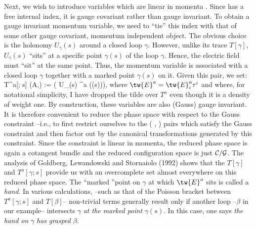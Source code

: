 Next, we wish to introduce variables which are linear in momenta \E .
Since \E\- has a free internal index, it is gauge covariant rather than
gauge invariant. To obtain a gauge invariant momentum variable, we need
to ``tie'' this index with that of some other gauge covariant, momentum
independent object. The obvious choice is the holonomy $U_\gamma(s)$
around a closed loop $\gamma$. However, unlike its trace $T[\gamma ]$,
$U_\gamma(s)$ ``sits'' at a specific point $\gamma(s)$ of the loop $\gamma$.
Hence, the electric field must ``sit'' at the same point. Thus, the
momentum variable is associated with a closed loop $\gamma$ together with
a marked point $\gamma(s)$ on it. Given this pair, we set:
\bneq
T^a[\gamma; s] (A,) :=  \tr \big( U_\gamma (s)
^a (\gamma(s))\big),
where $\tw{E}^a = \tw{E}^a_i\tau^i$ and where, for notational simplicity,
I have dropped the tilde over $T^a$ even though it is a density of weight
one. By construction, these variables are also (Gauss) gauge invariant.
It is therefore convenient to reduce the phase space with respect to the
Gauss constraint --i.e., to first restrict ourselves to the (\A\- ,\E\- )
pairs which satisfy the Gauss constraint and then factor out by the
canonical transformations generated by this constraint. Since the constraint
is linear in momenta, the reduced phase space is again a cotangent bundle
and the reduced configuration space is just ${\cal C}/{\cal G}$. The analysis
of Goldberg, Lewandowski and Stornaiolo (1992) shows that the $T[\gamma]$
and $T^a[\gamma; s]$ provide us with an overcomplete set almost
everywhere on this reduced phase space. The ``marked ''point on $\gamma$ at
which $\tw{E}^a$ sits is called a {\it hand}. In various calculations,
--such as that of the Poisson bracket between $T^a[\gamma; s]$ and
$T[\beta]$-- non-trivial terms generally result only if another loop
--$\beta$ in our example-- intersects $\gamma$ {\it at the marked point}
$\gamma(s)$. In this case, one says {\it the hand on} $\gamma$ {\it has
grasped} $\beta$.

